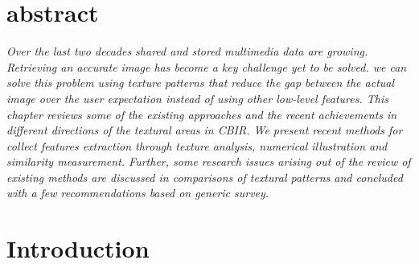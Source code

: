 \documentclass[review]{elsarticle}
\begin{document}
\newpage
	
	\section{abstract}
	\textit{ Over the last two decades shared and stored multimedia data are growing. Retrieving an accurate image has become a key challenge yet to be solved. we can solve this problem using texture patterns that reduce the gap between the actual image over the user expectation instead of using other low-level features. This chapter 
	reviews some of the existing approaches and the recent achievements in different directions  of the textural areas in CBIR. We present recent methods for   collect  features extraction through texture analysis, numerical illustration and similarity measurement. Further, some research issues arising out of the review of existing methods are discussed in comparisons of textural patterns and concluded with a few recommendations based on generic survey. }


	

\section{Introduction}
\end{document}
